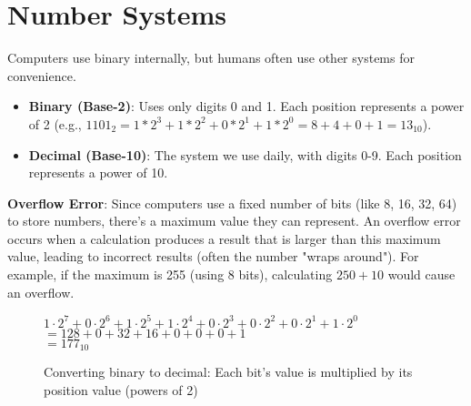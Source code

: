 \documentclass[11pt,oneside]{book}
\begin{document}
\section{Number Systems}
\label{sec:number_systems}
Computers use binary internally, but humans often use other systems for convenience.
\begin{itemize}
    \item \textbf{Binary (Base-2)}: Uses only digits 0 and 1. Each position represents a power of 2 (e.g., $1101_2 = 1*2^3 + 1*2^2 + 0*2^1 + 1*2^0 = 8 + 4 + 0 + 1 = 13_{10}$).
    \item \textbf{Decimal (Base-10)}: The system we use daily, with digits 0-9. Each position represents a power of 10.
\end{itemize}

\textbf{Overflow Error}: Since computers use a fixed number of bits (like 8, 16, 32, 64) to store numbers, there's a maximum value they can represent. An overflow error occurs when a calculation produces a result that is larger than this maximum value, leading to incorrect results (often the number "wraps around"). For example, if the maximum is 255 (using 8 bits), calculating $250 + 10$ would cause an overflow.

\begin{figure}[h!]
    \centering
    
    \vspace{1em}
    $1 \cdot 2^7 + 0 \cdot 2^6 + 1 \cdot 2^5 + 1 \cdot 2^4 + 0 \cdot 2^3 + 0 \cdot 2^2 + 0 \cdot 2^1 + 1 \cdot 2^0$\\
    $= 128 + 0 + 32 + 16 + 0 + 0 + 0 + 1$\\
    $= 177_{10}$
    
    \caption{Converting binary to decimal: Each bit's value is multiplied by its position value (powers of 2)}
    \label{fig:binary-byte}
\end{figure}
\end{document}
